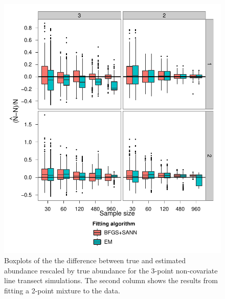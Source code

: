 \begin{figure}
\centering
\includegraphics{mix/figs/3point-N.pdf}
\caption{Boxplots of the the difference between true and estimated abundance rescaled by true abundance for the 3-point non-covariate line transect simulations. The second column shows the results from fitting a 2-point mixture to the data.}
\label{mmds-3point-N-boxplots}
\end{figure}

